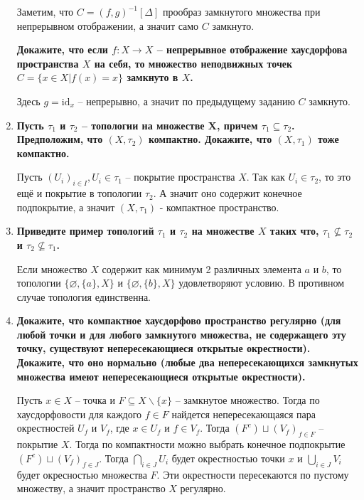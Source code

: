 \documentclass{article}
\begin{document}
\begin{enumerate}
        Заметим, что $C = (f, g)^{-1}[\Delta]$ прообраз замкнутого множества
        при непрерывном отображении, а значит само $C$ замкнуто.\par
        \textbf{Докажите, что если $f:X\longrightarrow X$ – непрерывное
        отображение хаусдорфова пространства $X$ на себя, то множество
        неподвижных точек $C=\{x\in X|f(x)=x\}$ замкнуто в $X$.}\par
        Здесь $g=\text{id}_x$ – непрерывно, а значит по предыдущему заданию $C$
        замкнуто.
    \item \textbf{Пусть $\tau_1$ и $\tau_2$ – топологии на множестве X, причем
        $\tau_1\subseteq \tau_2$. Предположим, что $(X, \tau_2)$ компактно.
        Докажите, что $(X, \tau_1)$ тоже компактно.}\par
        Пусть $(U_i)_{i\in I}, U_i \in \tau_1$ – покрытие пространства  $X$.
        Так как $U_i\in\tau_2$, то это ещё и покрытие в топологии $\tau_2$. А
        значит оно содержит конечное подпокрытие, а значит $(X, \tau_1)$ -
        компактное пространство.
    \item \textbf{Приведите пример топологий $\tau_1$ и $\tau_2$ на множестве
        $X$ таких что, $\tau_1\nsubseteq\tau_2$ и $\tau_2\nsubseteq\tau_1$.}\par
        Если множество $X$ содержит как минимум 2 различных элемента $a$ и $b$,
        то топологии $\{\varnothing, \{a\}, X\}$ и $\{\varnothing, \{b\}, X\}$
        удовлетворяют условию. В противном случае топология единственна.
    \item \textbf{Докажите, что компактное хаусдорфово пространство регулярно
        (для любой точки и для любого замкнутого множества, не содержащего эту
        точку, существуют непересекающиеся открытые окрестности). Докажите, что
        оно нормально (любые два непересекающихся замкнутых множества имеют
        непересекающиеся открытые окрестности).}\par Пусть $x\in X$ – точка и
        $F\subseteq X\backslash\{x\}$ – замкнутое множество. Тогда по хаусдорфовости
        для каждого $f\in F$ найдется непересекающаяся пара окрестностей $U_f$ и
        $V_f$, где $x\in U_f$ и $f\in V_f$. Тогда $(F^c)\sqcup (V_f)_{f\in F}$ –
        покрытие $X$. Тогда по компактности можно выбрать конечное подпокрытие
        $(F^c) \sqcup (V_f)_{f\in J}$. Тогда $\bigcap_{i\in J}U_i$ будет
        окрестностью точки $x$ и $\bigcup_{i\in J}V_i$ будет окресностью
        множества $F$. Эти окрестности пересекаются по пустому множеству, а
        значит пространство $X$ регулярно.\par

\end{enumerate}
\end{document}
